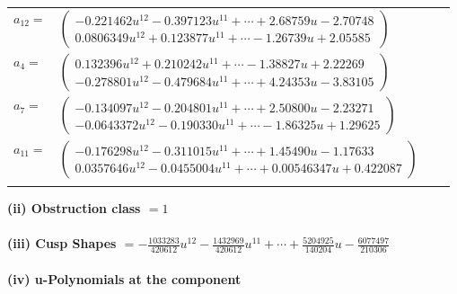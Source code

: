 \documentclass[1p]{elsarticle_modified}
\theoremstyle{definition}
\begin{document}
\begin{tabular}{m{7pt} m{180pt} m{7pt} m{180pt} }
\flushright $a_{12}=$&$\begin{pmatrix}-0.221462 u^{12}-0.397123 u^{11}+\cdots+2.68759 u-2.70748\\0.0806349 u^{12}+0.123877 u^{11}+\cdots-1.26739 u+2.05585\end{pmatrix}$ \\
\flushright $a_{4}=$&$\begin{pmatrix}0.132396 u^{12}+0.210242 u^{11}+\cdots-1.38827 u+2.22269\\-0.278801 u^{12}-0.479684 u^{11}+\cdots+4.24353 u-3.83105\end{pmatrix}$ \\
\flushright $a_{7}=$&$\begin{pmatrix}-0.134097 u^{12}-0.204801 u^{11}+\cdots+2.50800 u-2.23271\\-0.0643372 u^{12}-0.190330 u^{11}+\cdots-1.86325 u+1.29625\end{pmatrix}$ \\
\flushright $a_{11}=$&$\begin{pmatrix}-0.176298 u^{12}-0.311015 u^{11}+\cdots+1.45490 u-1.17633\\0.0357646 u^{12}-0.0455004 u^{11}+\cdots+0.00546347 u+0.422087\end{pmatrix}$\\&\end{tabular}
\flushleft \textbf{(ii) Obstruction class $= 1$}\\~\\
\flushleft \textbf{(iii) Cusp Shapes $= -\frac{1033283}{420612} u^{12}-\frac{1432969}{420612} u^{11}+\cdots+\frac{5204925}{140204} u-\frac{6077497}{210306}$}\\~\\
\newpage\renewcommand{\arraystretch}{1}
\flushleft \textbf{(iv) u-Polynomials at the component}\newline \\
\end{document}
